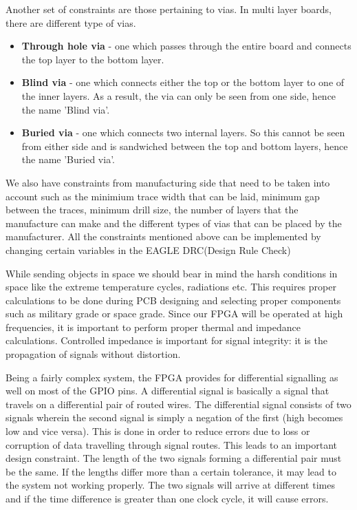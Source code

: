 \documentclass[../../main.tex]{subfiles}
\begin{document}
Another set of constraints are those pertaining to vias. In multi layer boards, there are different type of vias.
\begin{itemize}
    \item \textbf{Through hole via} - one which passes through the entire board and connects the top layer to the bottom layer.
    \item \textbf{Blind via} - one which connects either the top or the bottom layer to one of the inner layers. As a result, the via can only be seen from one side, hence the name 'Blind via'.
    \item \textbf{Buried via} - one which connects two internal layers. So this cannot be seen from either side and is sandwiched between the top and bottom layers, hence the name 'Buried via'.
\end{itemize}

We also have constraints from manufacturing side that need to be taken into account such as the minimium trace width that can be laid, minimum gap between the traces, minimum drill size, the number of layers that the manufacture can make and the different types of vias that can be placed by the manufacturer. All the constraints mentioned above can be implemented by changing certain variables in the EAGLE DRC(Design Rule Check)

While sending objects in space we should bear in mind the harsh conditions in space like the extreme temperature cycles, radiations etc. This requires proper calculations to be done during PCB designing and selecting proper components such as military grade or space grade. Since our FPGA will be operated at high frequencies, it is important to perform proper thermal and impedance calculations. Controlled impedance is important for signal integrity: it is the propagation of signals without distortion.

Being a fairly complex system, the FPGA provides for differential signalling as well on most of the GPIO pins. A differential signal is basically a signal that travels on a differential pair of routed wires. The differential signal consists of two signals wherein the second signal is simply a negation of the first (high becomes low and vice versa). This is done in order to reduce errors due to loss or corruption of data travelling through signal routes. This leads to an important design constraint. The length of the two signals forming a differential pair must be the same. If the lengths differ more than a certain tolerance, it may lead to the system not working properly. The two signals will arrive at different times and if the time difference is greater than one clock cycle, it will cause errors.
\end{document}

